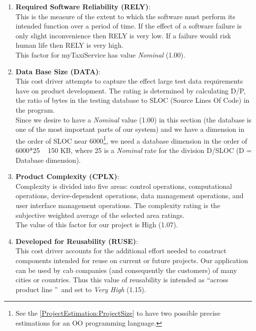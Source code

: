 \documentclass[\mainpath/main]{subfiles}
\begin{document}
\begin{enumerate}
	\item \textbf{Required Software Reliability (RELY)}:\\
	This is the measure of the extent to which the software must perform its intended
	function over a period of time. If the effect of a software failure is only slight inconvenience
	then RELY is very low. If a failure would risk human life then RELY is very high.\\
	This factor for myTaxiService has value \textit{Nominal} (1.00).
	
	\item \textbf{Data Base Size (DATA)}:\\
	This cost driver attempts to capture the effect large test data requirements have on
	product development. The rating is determined by calculating D/P, the ratio of bytes in the
	testing database to SLOC (Source Lines Of Code) in the program.\\
	Since we desire to have a \textit{Nominal} value (1.00) in this section (the database is one of the most important parts of our system) and we have a dimension in the order of SLOC near 6000\footnote{See the \autoref{ProjectEstimation:ProjectSize} to have two possible precise estimations for an OO programming language.}, we need a database dimension in the order of 6000*25 ~ 150 KB, where 25 is a \textit{Nominal} rate for the division D/SLOC (D = Database dimension).
	
	\item \textbf{Product Complexity (CPLX)}:\\
	Complexity is divided into five areas: control operations, computational operations,
	device-dependent operations, data management operations, and user interface management
	operations. The complexity rating is the subjective weighted
	average of the selected area ratings.\\
	The value of this factor for our project is High (1.07).
	
	\item \textbf{Developed for Reusability (RUSE)}:\\
	This cost driver accounts for the additional effort needed to construct components intended for reuse on current or future projects. Our application can be used by cab companies (and consequently the customers) of many cities or countries. Thus this value of reusability is intended as \textquotedblleft across product line \textquotedblright\ and set to \textit{Very High} (1.15).
	

\end{enumerate}
\end{document}
